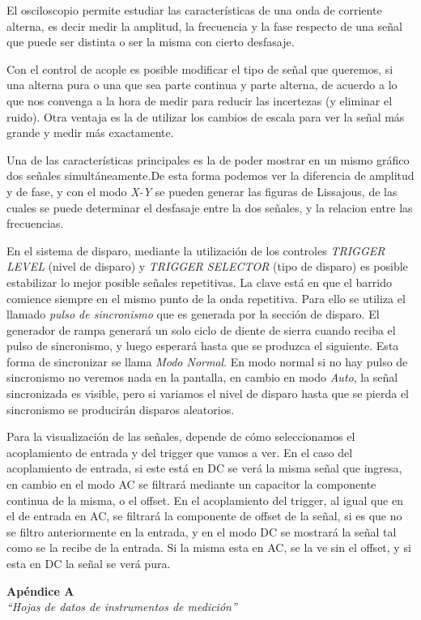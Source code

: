 \documentclass{article}
\begin{document}
	El osciloscopio permite estudiar las características de una onda de corriente alterna, es decir medir la amplitud, la frecuencia y la fase respecto de una señal que puede ser distinta o ser la misma con cierto desfasaje.
	\par
	Con el control de acople es posible modificar el tipo de señal que queremos, si una alterna pura o una que sea parte continua y parte alterna, de acuerdo a lo que nos convenga a la hora de medir para reducir las incertezas (y eliminar el ruido). Otra ventaja es la de utilizar los cambios de escala para ver la señal más grande y medir más exactamente. 
	\par
	Una de las características principales es la de poder mostrar en un mismo gráfico dos señales simultáneamente.De esta forma podemos ver la diferencia de amplitud y de fase, y con el modo \textit{X-Y} se pueden generar las figuras de Lissajous, de las cuales se puede determinar el desfasaje entre la dos señales, y la relacion entre las frecuencias.
	\par
	En el sistema de disparo, mediante la utilización de los controles \textit{TRIGGER LEVEL} (nivel de disparo) y \textit{TRIGGER SELECTOR} (tipo de disparo) es posible estabilizar lo mejor posible señales repetitivas. La clave está en que el barrido comience siempre en el mismo punto de la onda repetitiva. Para ello se utiliza el llamado \textit{pulso de sincronismo} que es generada por la sección de disparo. El generador de rampa generará un solo ciclo de diente de sierra cuando reciba el pulso de sincronismo, y luego esperará hasta que se produzca el siguiente. Esta forma de sincronizar se llama \textit{Modo Normal}. En modo normal si no hay pulso de sincronismo no veremos nada en la pantalla, en cambio en modo \textit{Auto}, la señal sincronizada es visible, pero si variamos el nivel de disparo hasta que se pierda el sincronismo se producirán disparos aleatorios.
	\par
	Para la visualización de las señales, depende de cómo seleccionamos el acoplamiento de entrada y del trigger que vamos a ver. En el caso del acoplamiento de entrada, si este está en DC se verá la misma señal que ingresa, en cambio en el modo AC se filtrará mediante un capacitor la componente continua de la misma, o el offset. En el acoplamiento del trigger, al igual que en el de entrada en AC, se filtrará la componente de offset de la señal, si es que no se filtro anteriormente en la entrada,  y en el modo DC se mostrará la señal tal como se la recibe de la entrada. Si la misma esta en AC, se la ve sin el offset, y si esta en DC la señal se verá pura.
\bigskip\bigskip


\newpage \textit{}
\newpage



\newpage
\vspace*{4cm}
\begin{center}
	\textbf{\Huge{Apéndice A}} \\
	\bigskip\bigskip
	\Large{\textit{``Hojas de datos de instrumentos de medición''}}
\end{center}


\newpage \textit{}
\newpage
\end{document}
